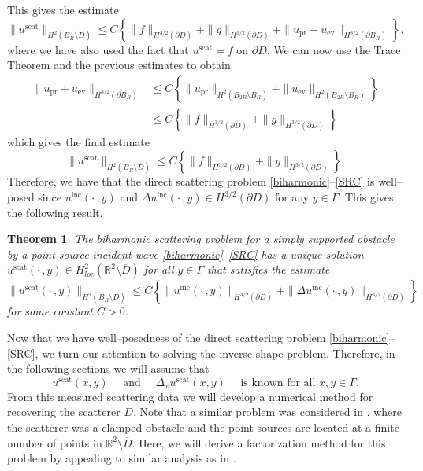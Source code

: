 \documentclass{article}
\newtheorem{theorem}{Theorem}[section]
\newcommand{\exD}{\mathbb{R}^2 \setminus \overline{D}}
\numberwithin{equation}{section}
\begin{document}
This gives the estimate  
$$\| u^{\text{scat}} \|_{H^2(B_R \setminus \overline{D})} \leq C \left\{\| f \|_{H^{3/2}(\partial{D})}  + \| g \|_{H^{3/2}(\partial{D})} +  \| u_\textrm{pr} +u_\textrm{ev} \|_{H^{3/2}(\partial{B_R})}  \right\},$$ 
where we have also used the fact that $u^{\text{scat}} = f$ on $\partial D$. We can now use the Trace Theorem and the previous estimates to obtain 
\begin{align*}
\| u_\textrm{pr} +u_\textrm{ev} \|_{H^{3/2}(\partial{B_R})}  &\leq   C \left\{\| u_\textrm{pr} \|_{H^2(B_{2R} \setminus \overline{B_R})} + \| u_\textrm{ev} \|_{H^2(B_{2R} \setminus \overline{B_R})} \right\} \\
&\leq   C \left\{\| f \|_{H^{3/2}(\partial{D})}  + \| g \|_{H^{3/2}(\partial{D})}  \right\}
\end{align*}
which gives the final estimate 
$$\| u^{\mathrm{scat}} \|_{H^2(B_R \setminus \overline{D})} \leq C \left\{\|f \|_{H^{3/2}(\partial{D})}  + \|g \|_{H^{3/2}(\partial{D})}  \right\}.$$ 
Therefore, we have that the direct scattering problem \eqref{biharmonic}--\eqref{SRC} is well--posed since $u^{\text{inc}}( \cdot \, , y)$ and $\Delta u^{\text{inc}}( \cdot \, , y) \in H^{3/2}(\partial D)$ for any $y \in \Gamma$. This gives the following result. 

\begin{theorem} \label{dp-wellposed}
The biharmonic scattering problem for a simply supported obstacle by a point source incident wave \eqref{biharmonic}--\eqref{SRC} has a unique solution $u^{\mathrm{scat}}( \cdot  \, ,y) \in H^2_{loc}(\exD)$ for all $y \in \Gamma$ that satisfies the estimate 
$$\| u^{\mathrm{scat}}( \cdot  \, ,y) \|_{H^2(B_R \setminus \overline{D})} \leq C \left\{\| u^{\mathrm{inc}}( \cdot \, , y) \|_{H^{3/2}(\partial{D})}  + \| \Delta u^{\mathrm{inc}}( \cdot \, , y) \|_{H^{3/2}(\partial{D})}  \right\}$$ 
for some constant $C>0$. 
\end{theorem}

Now that we have well--posedness of the direct scattering problem \eqref{biharmonic}--\eqref{SRC}, we turn our attention to solving the inverse shape problem. Therefore, in the following sections we will assume that 
$$u^{\text{scat}}( x , y) \quad \text{ and } \quad \Delta_x u^{\text{scat}}( x , y) \quad \text{ is known for all $x,y \in \Gamma$.}$$ 
From this measured scattering data we will develop a numerical method for recovering the scatterer $D$. Note that a similar problem was considered in \cite{iterative-BH23}, where the scatterer was a clamped obstacle and the point sources are located at a finite number of points in $\exD$. Here, we will derive a factorization method for this problem by appealing to similar analysis as in \cite{nf-fft-dsm}. 
\end{document}
